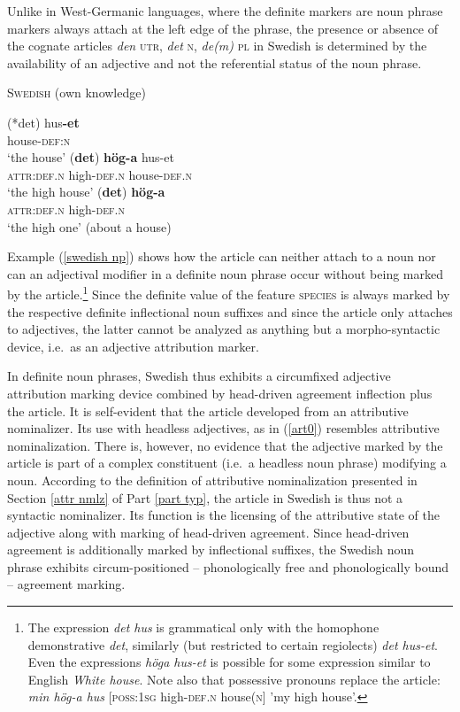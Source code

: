 Unlike in West-Germanic languages, where the definite markers are noun phrase markers always attach at the left edge of the phrase, the presence or absence of the cognate articles \textit{den} \textsc{utr}, \textit{det} \textsc{n}, \textit{de(m)} \textsc{pl} in Swedish is determined by the availability of an adjective and not the referential status of the noun phrase. 
\begin{exe}
\ex \textsc{Swedish} (own knowledge) \label{swedish np}
\begin{xlist}
\ex
\gll	(*det) hus\textbf{-et}\\
	{} house-\textsc{def:n}\\
\glt	‘the house’
\ex	
\gll	*(\textbf{det}) \textbf{hög-a} hus-et\\
	\textsc{attr:def.n} high-\textsc{def.n} house-\textsc{def.n}\\
\glt	‘the high house’
\ex	\label{art0}
\gll	*(\textbf{det}) \textbf{hög-a}\\
	\textsc{attr:def.n} high-\textsc{def.n}\\
\glt	‘the high one’ (about a house)
\end{xlist}
\end{exe}
Example (\ref{swedish np}) shows how the article can neither attach to a noun nor can an adjectival modifier in a definite noun phrase occur without being marked by the article.\footnote{The expression \textit{det hus} is grammatical only with the homophone demonstrative \textit{det}, similarly (but restricted to certain regiolects) \textit{det hus-et}. Even the expressions \textit{höga hus-et} is possible for some expression similar to English \textit{White house}. Note also that possessive pronouns replace the article: \textit{min hög-a hus} [\textsc{poss:1sg} high-\textsc{def.n} house(\textsc{n}] 'my high house’.} Since the definite value of the feature \textsc{species} is always marked by the respective definite inflectional noun suffixes %
 and since the article only attaches to adjectives, the latter cannot be analyzed as anything but a morpho-syntactic device, i.e.~as an adjective attribution marker.

In definite noun phrases, Swedish thus exhibits a circumfixed adjective attribution marking device combined by head-driven agreement inflection plus the article. It is self-evident that the article developed from an attributive nominalizer. Its use with headless adjectives, as in (\ref{art0}) resembles attributive nominalization. There is, however, no evidence that the adjective marked by the article is part of a complex constituent (i.e.~a headless noun phrase) modifying a noun. According to the definition of attributive nominalization presented in Section \ref{attr nmlz} of Part \ref{part typ}, the article in Swedish is thus not a syntactic nominalizer. Its function is the licensing of the attributive state of the adjective along with marking of head-driven agreement. Since head-driven agreement is additionally marked by inflectional suffixes, the Swedish noun phrase exhibits circum-positioned – phonologically free and phonologically bound – agreement marking.

